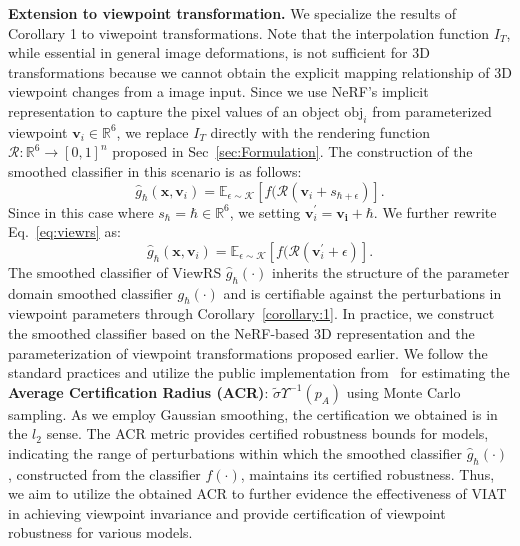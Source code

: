 \documentclass[10pt,journal,compsoc]{IEEEtran}
\begin{document}
\textbf{Extension to viewpoint transformation.} We specialize the results of Corollary 1 to viwepoint transformations.  Note that the interpolation function $I_T$, while essential in general image deformations, is not sufficient for 3D transformations because we cannot obtain the explicit mapping relationship of  3D viewpoint changes from a image input. Since we use NeRF's implicit representation to capture the pixel values of an object $\text{obj}_i$ from parameterized viewpoint $\mathbf{v}_i \in \mathbb{R}^6$, we replace $I_T$  directly with the rendering function  $\mathcal{R}:\mathbb{R}^6 \rightarrow [0,1]^n$ proposed in Sec~\ref{sec:Formulation}. The construction of the smoothed classifier in this scenario is as follows:
\begin{equation}
    \hat{g}_\hbar(\mathbf{x},\mathbf{v}_i) = \mathbb{E}_{\epsilon \sim \mathcal{K}}[f(\mathcal{R}(\textbf{v}_i+s_{\hbar+\epsilon})].
\label{eq:viewrs}
\end{equation}
Since in this case where $s_\hbar=\hbar \in \mathbb{R}^6$, we setting $\mathbf{v}_i^\prime=\mathbf{v_i}+\hbar$. We further rewrite Eq.~\ref{eq:viewrs} as:
\begin{equation}
    \hat{g}_\hbar(\mathbf{x},\mathbf{v}_i) = \mathbb{E}_{\epsilon \sim \mathcal{K}}[f(\mathcal{R}(\textbf{v}_i^\prime+\epsilon)].
\label{eq:viewrs2}
\end{equation}
The smoothed classifier of ViewRS $\hat{g}_\hbar(\cdot)$ inherits the structure of the parameter domain smoothed classifier $g_\hbar(\cdot)$ and is certifiable against the perturbations in viewpoint parameters through Corollary~\ref{corollary:1}. In practice, we construct the smoothed classifier based on the NeRF-based 3D representation and the parameterization of viewpoint transformations proposed earlier. We follow the standard practices and utilize the public implementation from~\cite{cohen2019certified} for estimating the \textbf{Average Certification Radius (ACR)}: $\tilde{\sigma}\Upsilon^{-1}(p_A)$ using Monte Carlo sampling. As we employ Gaussian smoothing, the certification we obtained is in the $l_2$ sense. The ACR metric provides certified robustness bounds for models, indicating the range of perturbations within which the smoothed classifier  $\hat{g}_\hbar(\cdot)$, constructed from the classifier $f(\cdot)$, maintains its certified robustness. Thus, we aim to utilize the obtained ACR to further evidence the effectiveness of VIAT in achieving viewpoint invariance and provide certification of viewpoint robustness for various models.
\end{document}
